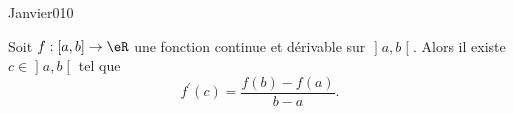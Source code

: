\begin{corrige}{Janvier010}

Soit $f : [a,b] \to \eR$ une fonction continue et dérivable sur $\mathopen]a,b\mathclose[$.  Alors il existe $c \in \mathopen]a,b\mathclose[$ tel que
\begin{equation}
  f^\prime(c) = \frac{f(b)-f(a)}{b-a}.
\end{equation}

%

\end{corrige}
